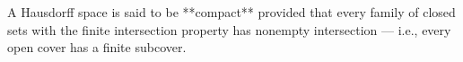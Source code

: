 A Hausdorff space is said to be **compact** provided that every family of closed sets with the finite intersection property has nonempty intersection — i.e., every open cover has a finite subcover.

